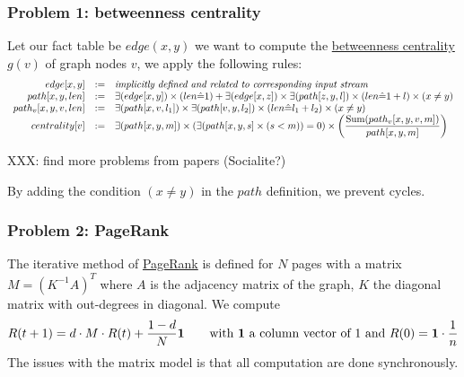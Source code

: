 \documentclass[11pt]{article}
\begin{document}
\subsubsection*{Problem 1: betweenness centrality}
Let our fact table be $edge(x,y)$ we want to compute the \href{http://en.wikipedia.org/wiki/Betweenness_centrality}{betweenness centrality} $g(v)$ of graph nodes $v$, we apply the following rules:
\[\begin{array}{rcl}
edge[x,y] & := & \text{\it implicitly defined and related to corresponding input stream} \\
path[x,y,len] & := & \exists(edge[x,y]) \times (len\hat= 1) +  \exists(edge[x,z]) \times \exists(path[z,y,l]) \times (len\hat= 1+l) \times (x\ne y)\\
path_v[x,y,v,len] & := & \exists(path[x,v,l_1]) \times \exists(path[v,y,l_2]) \times (len\hat= l_1+l_2) \times (x\ne y) \\
centrality[v] & := & \exists(path[x,y,m]) \times (\exists(path[x,y,s] \times (s<m)) = 0) \times \left(\dfrac{{\rm Sum}(path_v[x,y,v,m])}{path[x,y,m]}\right)
\end{array}\]

XXX: find more problems from papers (Socialite?)


By adding the condition $(x\ne y )$ in the $path$ definition, we prevent cycles.

\subsubsection*{Problem 2: PageRank}
The iterative method of \href{http://en.wikipedia.org/wiki/PageRank#Iterative}{PageRank} is defined for $N$ pages with a matrix $M=(K^{-1} A)^T$ where $A$ is the adjacency matrix of the graph, $K$ the diagonal matrix with out-degrees in diagonal. We compute \[R(t+1)=d\cdot M\cdot R(t)+\dfrac{1-d}{N}{\bf 1} \qquad \text{with {\bf 1} a column vector of 1 and }R(0)={\bf 1}\cdot \frac{1}{n}\]
The issues with the matrix model is that all computation are done synchronously.
\end{document}
